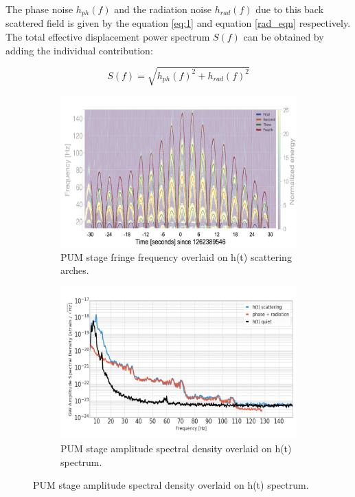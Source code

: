 \documentclass[12pt]{iopart}
\begin{document}
The phase noise $h_{ph}
(f)$ and the radiation noise $h_{rad}(f)$ due to this back scattered field is given by the equation \ref{eq:1} and equation \ref{rad_eqn} respectively. 
The total effective displacement power spectrum $S(f)$ can be obtained by adding the individual contribution:

\begin{equation}
S(f) = \sqrt{h_{ph}(f)^2 + h_{rad}(f)^2} \label{total_noise}
\end{equation}



\begin{figure}[h]
\captionsetup[subfigure]{font=scriptsize,labelfont=scriptsize}
   \centering
    \begin{subfigure}[b]{0.45\textwidth}
        \centering
         \includegraphics[width= \textwidth]{fringe_l2c.png}
         \caption{PUM stage fringe frequency overlaid on h(t) scattering arches.}
         \label{fig:fringel2}
    \end{subfigure}
    \hfill
    \begin{subfigure}[b]{0.45\textwidth}
        \centering
         \includegraphics[width =\textwidth]{spectrum_l2new2.png}
         \caption{PUM stage amplitude spectral density overlaid on h(t) spectrum.}
         \label{fig:spectruml2}
         

\end{subfigure}
\end{figure}
\end{document}
